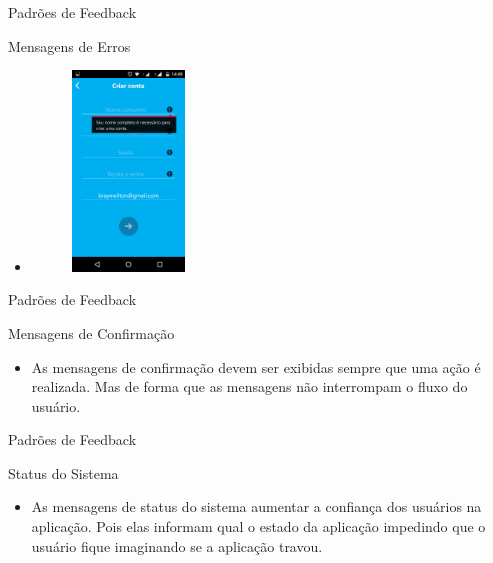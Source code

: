 \begin{frame}{Padrões de Feedback}
\begin{block}{Mensagens de Erros}
  \begin{itemize}
    \item<1-> \begin{figure}
    \includegraphics[width=3cm]{figuras/error/error5}
    \end{figure}
  \end{itemize}
\end{block}
\end{frame}

\begin{frame}{Padrões de Feedback}
\begin{block}{Mensagens de Confirmação}
  \begin{itemize}
    \item<1-> As mensagens de confirmação devem ser exibidas sempre que uma ação é realizada. Mas de forma que as mensagens não interrompam o fluxo do usuário.
  \end{itemize}
\end{block}
\end{frame}

\begin{frame}{Padrões de Feedback}
\begin{block}{Status do Sistema}
  \begin{itemize}
    \item<1-> As mensagens de status do sistema aumentar a confiança dos usuários na aplicação. Pois elas informam qual o estado da aplicação impedindo que o usuário fique imaginando se a aplicação travou.
  \end{itemize}
\end{block}
\end{frame}

